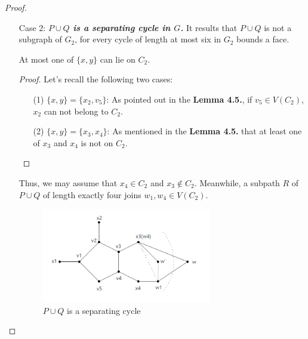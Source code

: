 \begin{proof}
\begin{itemize}
\begin{proof}
\begin{itemize}
\begin{figure}[H]
            \caption{Path is $x_4u_1u_2v_3$.} %
            \label{figure} %
        \end{figure}
        Then $u_2 = x_3$. As discussed in \textbf{Lemma 4.5.}, at most one of $x_3, x_4$ can lie on $C_2$. Therefore, $x_4u_1u_2(x_3)v_3v_4$ would form a separating cycle of length five, which is a contradiction.
    \end{itemize}
    \end{proof}
    
    \item[Case 2:]\textit{\textbf{$P \cup Q$ is a separating cycle in $G$.}} It results that $P \cup Q$ is not a subgraph of $G_2$, for every cycle of length at most six in $G_2$ bounds a face.  
    
    \begin{claim}
    At most one of $\{x, y\}$ can lie on $C_2$.
    \end{claim}
\begin{proof}
    Let's recall the following two cases:
    \begin{itemize}
        \item[(1)] \textit{\textbf{$\{x, y\} = \{x_2, v_5\}$}}: As pointed out in the \textbf{Lemma 4.5.}, if $v_5 \in V(C_2)$, $x_2$ can not belong to $C_2$.
        \item[(2)] \textit{\textbf{$\{x, y\} = \{x_3, x_4\}$}}: As mentioned in the \textbf{Lemma 4.5.} that at least one of $x_3$ and $x_4$ is not on $C_2$.
    \end{itemize}
\end{proof}
Thus, we may assume that $x_4 \in C_2$ and $x_3 \notin C_2$. Meanwhile, a subpath $R$ of $P \cup Q$ of length exactly four joins $w_1, w_4 \in V(C_2)$. 
\begin{figure}[H] %
    \centering %
    \includegraphics[width=0.7\textwidth]{figure/lemma2.2.png} 
    \caption{$P \cup Q$ is a separating cycle} %

\end{figure}
\end{itemize}
\end{proof}
